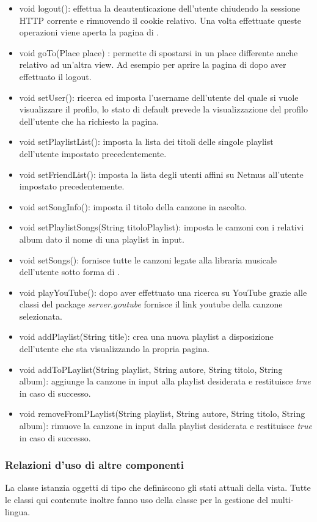 \begin{itemize}
    \item void logout(): effettua la deautenticazione dell'utente chiudendo la
    sessione HTTP corrente e rimuovendo il cookie relativo. Una volta effettuate
    queste operazioni viene aperta la pagina di .
    \item void goTo(Place place) : permette di spostarsi in un place differente
    anche relativo ad un'altra view. Ad esempio per aprire la pagina di
     dopo aver effettuato il logout.
    \item void setUser(): ricerca ed imposta l'username dell'utente del quale
    si vuole visualizzare il profilo, lo stato di default prevede la
    visualizzazione del profilo dell'utente che ha richiesto la
    pagina.
    \item void setPlaylistList(): imposta la lista dei
    titoli delle singole playlist dell'utente impostato precedentemente.
    \item void setFriendList(): imposta la lista degli
    utenti affini su Netmus all'utente impostato precedentemente.
    \item void setSongInfo(): imposta il titolo della canzone in
    ascolto.
    \item void setPlaylistSongs(String titoloPlaylist): imposta le canzoni
    con i relativi album dato il nome di una playlist in input.
    \item void setSongs(): fornisce tutte le canzoni legate alla libraria
    musicale dell'utente sotto forma di .
    \item void playYouTube(): dopo aver effettuato una ricerca su YouTube grazie
    alle classi del package \emph{server.youtube} fornisce il link youtube della
    canzone selezionata.
    \item void addPlaylist(String title): crea una nuova playlist a
    disposizione dell'utente che sta visualizzando la propria pagina.
    \item void addToPLaylist(String playlist, String autore, String titolo,
    String album): aggiunge la canzone in input alla playlist desiderata e
    restituisce \emph{true} in caso di successo.
    \item void removeFromPLaylist(String playlist, String autore, String titolo,
    String album): rimuove la canzone in input dalla playlist desiderata e
    restituisce \emph{true} in caso di successo.
\end{itemize}
\subsubsection*{Relazioni d'uso di altre componenti}
La classe istanzia oggetti di tipo  che definiscono gli stati
attuali della vista.
Tutte le classi qui contenute inoltre fanno uso della classe 
per la gestione del multi-lingua. 
